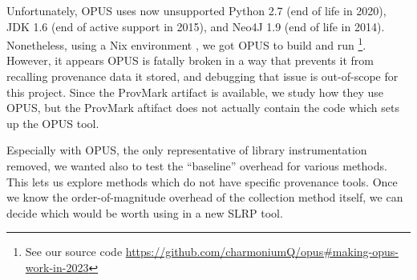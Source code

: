 Unfortunately, OPUS uses now unsupported Python 2.7 (end of life in 2020), JDK 1.6 (end of active support in 2015), and Neo4J 1.9 (end of life in 2014).
Nonetheless, using a Nix environment \cite{dolstra_purely_2006}, we got OPUS to build and run \footnote{See our source code \url{https://github.com/charmoniumQ/opus\#making-opus-work-in-2023}}.
However, it appears OPUS is fatally broken in a way that prevents it from recalling provenance data it stored, and debugging that issue is out-of-scope for this project.
Since the ProvMark artifact is available, we study how they use OPUS, but the ProvMark aftifact does not actually contain the code which sets up the OPUS tool.

Especially with OPUS, the only representative of library instrumentation removed, we wanted also to test the ``baseline'' overhead for various methods.
This lets us explore methods which do not have specific provenance tools.
Once we know the order-of-magnitude overhead of the collection method itself, we can decide which would be worth using in a new SLRP tool.


